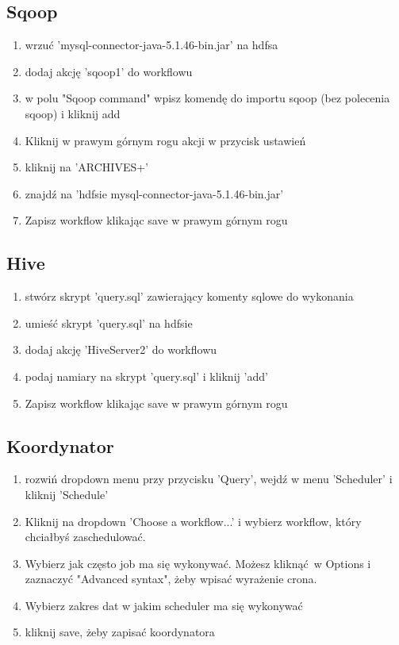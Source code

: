 \documentclass[11pt]{article}
\begin{document}
\subsection*{Sqoop}
\begin{enumerate}
\item wrzuć 'mysql-connector-java-5.1.46-bin.jar' na hdfsa
\item dodaj akcję 'sqoop1' do workflowu
\item w polu "Sqoop command" wpisz komendę do importu sqoop (bez polecenia sqoop) i kliknij add
\item Kliknij w prawym górnym rogu akcji w przycisk ustawień
\item kliknij na 'ARCHIVES+'
\item znajdź na 'hdfsie mysql-connector-java-5.1.46-bin.jar'
\item Zapisz workflow klikając save w prawym górnym rogu
\end{enumerate}

\subsection*{Hive}
\begin{enumerate}
\item stwórz skrypt 'query.sql' zawierający komenty sqlowe do wykonania
\item umieść skrypt 'query.sql' na hdfsie
\item dodaj akcję 'HiveServer2' do workflowu
\item podaj namiary na skrypt 'query.sql' i kliknij 'add'
\item Zapisz workflow klikając save w prawym górnym rogu
\end{enumerate}

\subsection*{Koordynator}
\begin{enumerate}
\item rozwiń dropdown menu przy przycisku 'Query', wejdź w menu 'Scheduler' i kliknij  'Schedule'
\item Kliknij na dropdown 'Choose a workflow...' i wybierz workflow, który chciałbyś zaschedulować.
\item Wybierz jak często job ma się wykonywać. Możesz kliknąć w Options i zaznaczyć "Advanced syntax", żeby wpisać wyrażenie crona.
\item Wybierz zakres dat w jakim scheduler ma się wykonywać
\item kliknij save, żeby zapisać koordynatora
\end{enumerate}
\end{document}
